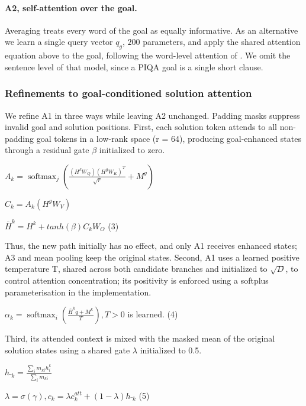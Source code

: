 \documentclass[11pt]{article}
\begin{document}
\paragraph{A2, self-attention over the goal.}

Averaging treats every word of the goal as equally informative. As an alternative we learn a single query vector ${q}_{g}$, $200$ parameters, and apply the shared attention equation above to the goal, following the word-level attention of \citet{yang2016hierarchical}. We omit the sentence level of that model, since a PIQA goal is a single short clause.

\subsubsection{Refinements to goal-conditioned solution attention}

We refine A1 in three ways while leaving A2 unchanged. Padding masks suppress invalid goal and solution positions. First, each solution token attends to all non-padding goal tokens in a low-rank space (r = 64), producing goal-enhanced states through a residual gate $\beta$ initialized to zero.

${A}_{k} = {\operatorname{softmax}}_{j}\left( \frac{\left( {H}^{k}{W}_{Q} \right){\left( {H}^{g}{W}_{K} \right)}^{T}}{\sqrt{r}} + {M}^{g} \right)$

${C}_{k} = {A}_{k}\left( {H}^{g}{W}_{V} \right)$

${\bar{H}}^{k} = {H}^{k} + tanh\left( \beta \right){C}_{k}{W}_{O}$ (3)

Thus, the new path initially has no effect, and only A1 receives enhanced states; A3 and mean pooling keep the original states. Second, A1 uses a learned positive temperature T, shared across both candidate branches and initialized to $\sqrt{D}$, to control attention concentration; its positivity is enforced using a softplus parameterisation in the implementation.

${\alpha }_{k} = {\operatorname{softmax}}_{i}\left( \frac{{\bar{H}}^{k}q + {M}^{k}}{T} \right), T>0$ is learned. (4)

Third, its attended context is mixed with the masked mean of the original solution states using a shared gate $\lambda$ initialized to 0.5.

${h\bar{}}_{k} = \frac{{\sum }_{i}{m}_{ki}{h}_{i}^{k}}{{\sum }_{i}{m}_{ki}}$

$\lambda = \sigma \left( \gamma \right), {c}_{k} = \lambda {c}_{k}^{att} + \left( 1 - \lambda \right){h\bar{}}_{k}$ (5)
\end{document}
